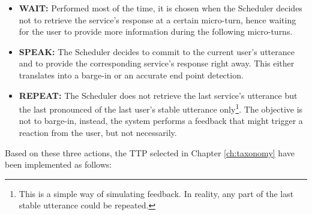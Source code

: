      \begin{itemize}
       \item \textbf{WAIT:} Performed most of the time, it is chosen when the Scheduler decides not to retrieve the service's response at a certain micro-turn, hence waiting for the user to provide more information during the following micro-turns.
       \item \textbf{SPEAK:} The Scheduler decides to commit to the current user's utterance and to provide the corresponding service's response right away. This either translates into a barge-in or an accurate end point detection.
       \item \textbf{REPEAT:} The Scheduler does not retrieve the last service's utterance but the last pronounced of the last user's stable utterance only\footnote{This is a simple way of simulating feedback. In reality, any part of the last stable utterance could be repeated.}. The objective is not to barge-in, instead, the system performs a feedback that might trigger a reaction from the user, but not necessarily.
     \end{itemize}

     Based on these three actions, the TTP selected in Chapter \ref{ch:taxonomy} have been implemented as follows:

